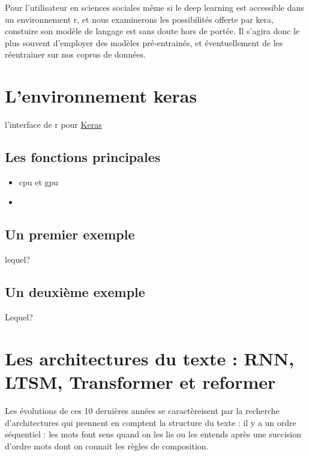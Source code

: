 \documentclass[
]{book}
\begin{document}
Pour l'utilisateur en sciences sociales même si le deep learning est accessible dans un environnement r, et nous examinerons les possibilités offerte par kera, constuire son modèle de langage est sans doute hors de portée. Il s'agira donc le plus souvent d'employer des modèles pré-entrainés, et éventuellement de les réentrainer sur nos coprus de données.

\hypertarget{lenvironnement-keras}{%
\section{L'environnement keras}\label{lenvironnement-keras}}

l'interface de r pour \href{https://keras.rstudio.com/}{Keras}

\hypertarget{les-fonctions-principales}{%
\subsection{Les fonctions principales}\label{les-fonctions-principales}}

\begin{itemize}
\item
  cpu et gpu
\item
\end{itemize}

\hypertarget{un-premier-exemple}{%
\subsection{Un premier exemple}\label{un-premier-exemple}}

lequel?

\hypertarget{un-deuxiuxe8me-exemple}{%
\subsection{Un deuxième exemple}\label{un-deuxiuxe8me-exemple}}

Lequel?

\hypertarget{les-architectures-du-texte-rnn-ltsm-transformer-et-reformer}{%
\section{Les architectures du texte : RNN, LTSM, Transformer et reformer}\label{les-architectures-du-texte-rnn-ltsm-transformer-et-reformer}}

Les évolutions de ces 10 dernières années se caractèreisent par la recherche d'architectures qui prennent en comptent la structure du texte : il y a un ordre séquentiel : les mots font sens quand on les lis ou les entends après une succision d'ordre mots dont on connait les règles de composition.
\end{document}
